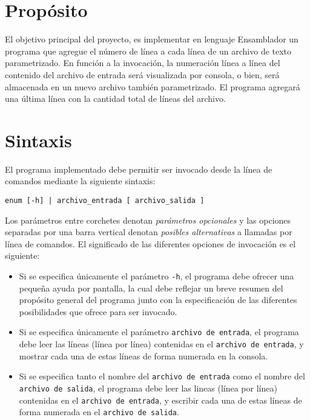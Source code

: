 \documentclass[12pt,a4paper]{article}
\begin{document}

\section*{Propósito}
El objetivo principal del proyecto, es implementar en lenguaje Ensamblador un programa que agregue el número de línea a cada línea de un archivo de texto parametrizado. En función a la invocación, la numeración línea a línea del contenido del archivo de entrada será visualizada por consola, o bien, será almacenada en un nuevo archivo también parametrizado. El programa agregará una última línea con la cantidad total de líneas del archivo.

\section*{Sintaxis}
El programa implementado debe permitir ser invocado desde la línea de comandos mediante la siguiente sintaxis:
\begin{center}
	\texttt{enum [-h] | archivo\_entrada [ archivo\_salida ]}
\end{center}

Los parámetros entre corchetes denotan \textit{parámetros opcionales} y las opciones separadas por una barra vertical denotan \textit{posibles alternativas} a llamadas por línea de comandos. El significado de las diferentes opciones de invocación es el siguiente:
\begin{itemize}
	\item Si se especifica únicamente el parámetro \texttt{-h}, el programa debe ofrecer una pequeña ayuda por pantalla, la cual debe reflejar un breve resumen del propósito general del programa junto con la especificación de las diferentes posibilidades que ofrece para ser invocado.
	\item Si se especifica únicamente el parámetro \texttt{archivo de entrada}, el programa debe leer las líneas (línea por línea) contenidas en el \texttt{archivo de entrada}, y mostrar cada una de estas líneas de forma numerada en la consola. 
	\item Si se especifica tanto el nombre del \texttt{archivo de entrada} como el nombre del \texttt{archivo de salida}, el programa debe leer las lineas (línea por línea) contenidas en el \texttt{archivo de entrada}, y escribir cada una de estas líneas de forma numerada en el \texttt{archivo de salida}.
\end{itemize}
	
\end{document}

